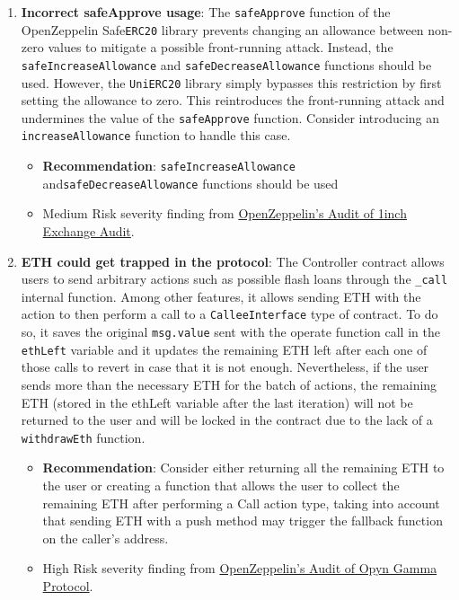 \begin{enumerate}
\item\textbf{Incorrect safeApprove usage}: The \verb|safeApprove| function of the OpenZeppelin Safe\verb|ERC20| library prevents changing an allowance between non-zero values to mitigate a possible front-running attack. Instead, the \verb|safeIncreaseAllowance| and \verb|safeDecreaseAllowance| functions should be used. However, the \verb|UniERC20| library simply bypasses this restriction by first setting the allowance to zero. This reintroduces the front-running attack and undermines the value of the \verb|safeApprove| function. Consider introducing an \verb|increaseAllowance| function to handle this case.
	\begin{itemize}
	\item\textbf{Recommendation}: \verb|safeIncreaseAllowance| and\linebreak\verb|safeDecreaseAllowance| functions should be used
	\item Medium Risk severity finding from \href{https://blog.openzeppelin.com/1inch-exchange-audit/}{OpenZeppelin’s Audit of 1inch Exchange Audit}.
	\end{itemize}

\item\textbf{ETH could get trapped in the protocol}: The Controller contract allows users to send arbitrary actions such as possible flash loans through the \verb|_call| internal function. Among other features, it allows sending ETH with the action to then perform a call to a \verb|CalleeInterface| type of contract. To do so, it saves the original \verb|msg.value| sent with the operate function call in the \verb|ethLeft| variable and it updates the remaining ETH left after each one of those calls to revert in case that it is not enough. Nevertheless, if the user sends more than the necessary ETH for the batch of actions, the remaining ETH (stored in the ethLeft variable after the last iteration) will not be returned to the user and will be locked in the contract due to the lack of a \verb|withdrawEth| function.
	\begin{itemize}
	\item\textbf{Recommendation}: Consider either returning all the remaining ETH to the user or creating a function that allows the user to collect the remaining ETH after performing a Call action type, taking into account that sending ETH with a push method may trigger the fallback function on the caller’s address.
	\item High Risk severity finding from \href{https://blog.openzeppelin.com/opyn-gamma-protocol-audit/}{OpenZeppelin’s Audit of Opyn Gamma Protocol}.
	\end{itemize}


\end{enumerate}
